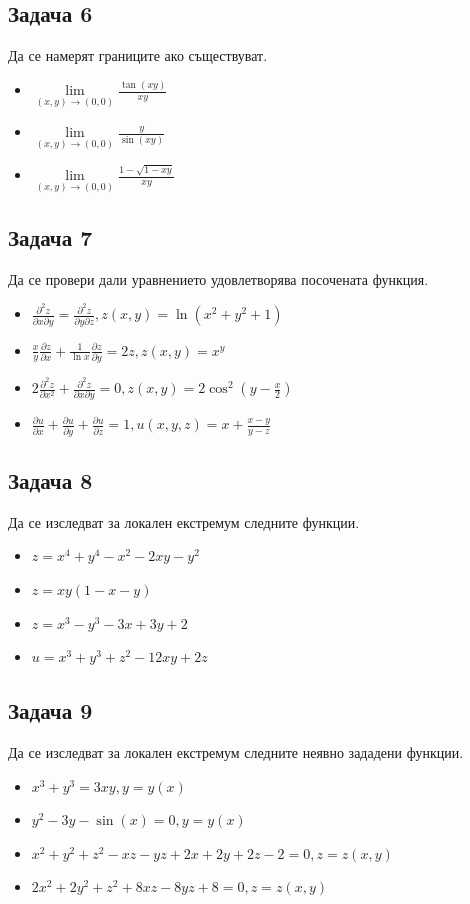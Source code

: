 \documentclass[a4paper,fleqn,12pt]{article}
\theoremstyle{definition}
\begin{document}
\subsection*{Задача 6}
Да се намерят границите ако съществуват.
\begin{itemize}
\item $\lim\limits_{(x,y) \to (0,0)} \frac{\tan(xy)}{xy}$
\item $\lim\limits_{(x,y) \to (0,0)} \frac{y}{\sin{(xy)}}$
\item $\lim\limits_{(x,y) \to (0,0)} \frac{1 - \sqrt{1 - xy}}{xy}$
\end{itemize}

\subsection*{Задача 7}
Да се провери дали уравнението удовлетворява посочената функция.
\begin{itemize}
\item $\frac{\partial^2 z}{\partial x \partial y} = \frac{\partial^2 z}{\partial y \partial z}, z(x,y) = \ln(x^2+y^2+1)$
\item $\frac{x}{y}\frac{\partial z}{\partial x} + \frac{1}{\ln x} \frac{\partial z}{\partial y } = 2z, z(x,y) =x^y$
\item $2 \frac{\partial^2 z}{\partial x^2 } + \frac{\partial^2 z}{\partial x \partial y} = 0, z(x,y) = 2\cos^2(y - \frac{x}{2})$
\item $\frac{\partial u}{\partial x} + \frac{\partial u}{\partial y} + \frac{\partial u}{\partial z} = 1, u(x,y,z) = x + \frac{x-y}{y-z}$
\end{itemize}

\subsection*{Задача 8}
Да се изследват за локален екстремум следните функции.
\begin{itemize}
\item $z = x^4 + y^4- x^2- 2xy - y^2$
\item $z = xy(1 - x - y)$
\item $z = x^3 - y^3 - 3x + 3y + 2$
\item $u = x^3 + y^3 + z^2 - 12xy + 2z$
\end{itemize}

\subsection*{Задача 9}
Да се изследват за локален екстремум следните неявно зададени функции.
\begin{itemize}
\item $x^3 + y^3 = 3xy, y = y(x)$
\item $y^2 -3y - \sin(x)= 0, y = y(x)$
\item $x^2 + y^2 + z^2 - xz -yz + 2x + 2y + 2z - 2 = 0, z = z(x,y)$
\item $2x^2 + 2y^2 + z^2 + 8xz -8yz + 8 = 0, z = z(x,y)$
\end{itemize}
\end{document}
